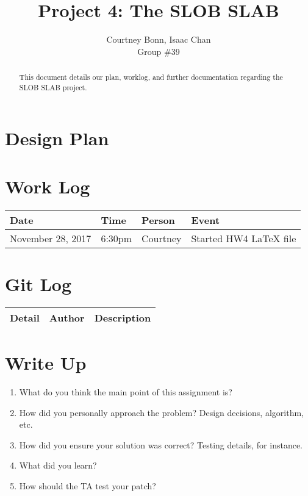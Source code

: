 \documentclass[letterpaper,10pt,draftclsnofoot,onecolumn,titlepage]{IEEEtran}
\def\name{Courtney Bonn, Isaac Chan}
\def\grp{Group \#39}
\begin{document}
\title{Project 4: The SLOB SLAB}
\author{\name \\ \grp}

\maketitle

\begin{abstract}
   This document details our plan, worklog, and further documentation regarding the SLOB SLAB project.
\end{abstract}

\section{Design Plan}

\section{Work Log}
\begin{center}
\begin{tabular}{p{3cm}p{1cm}p{1cm}p{10cm} }
 Date  & Time & Person & Event \\ \hline
November 28, 2017 & 6:30pm & Courtney & Started HW4 LaTeX file \\
\end{tabular}
\end{center}

\section{Git Log}
\begin{tabular}{p{2cm} p{2cm} p{10cm}}\textbf{Detail} & \textbf{Author} & \textbf{Description}\\\hline
\end{tabular}

\section{Write Up}
\begin{enumerate}
                \item What do you think the main point of this assignment is? \\
                \item How did you personally approach the problem? Design decisions, algorithm, etc. \\

                \item How did you ensure your solution was correct? Testing details, for instance. \\
                \item What did you learn? \\
		\item How should the TA test your patch? \\
\end{enumerate}
\end{document}
